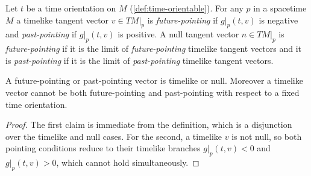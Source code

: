 \begin{definition}
    \label{def:future-and-past-pointing-vectors}
    \leanok
    Let $t$ be a time orientation on $M$ (\ref{def:time-orientable}). For any $p$ in a spacetime $M$ a timelike tangent vector $v \in TM|_p$ is \textit{future-pointing} if $g|_p(t,v)$ is negative and \textit{past-pointing} if $g|_p(t,v)$ is positive. A null tangent vector $n \in TM|_p$ is \textit{future-pointing} if it is the limit of \textit{future-pointing} timelike tangent vectors and it is \textit{past-pointing} if it is the limit of \textit{past-pointing} timelike tangent vectors.
\end{definition}

\begin{lemma}
    \label{lmm:pointing-orientation}
    \leanok
    A future-pointing or past-pointing vector is timelike or null. Moreover a timelike vector cannot be both future-pointing and past-pointing with respect to a fixed time orientation.
\end{lemma}
\begin{proof}
    \leanok
    The first claim is immediate from the definition, which is a disjunction over the timelike and null cases. For the second, a timelike $v$ is not null, so both pointing conditions reduce to their timelike branches $g|_p(t,v) < 0$ and $g|_p(t,v) > 0$, which cannot hold simultaneously.
\end{proof}

